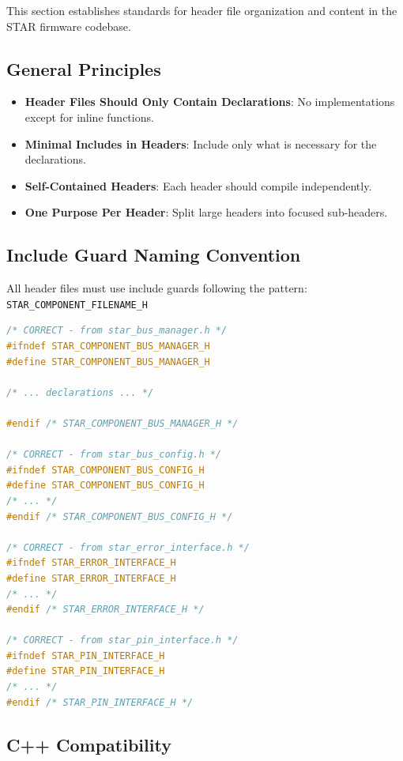 This section establishes standards for header file organization and content in the STAR firmware codebase.

\subsection{General Principles}

\begin{itemize}
    \item \textbf{Header Files Should Only Contain Declarations}: No implementations except for inline functions.
    \item \textbf{Minimal Includes in Headers}: Include only what is necessary for the declarations.
    \item \textbf{Self-Contained Headers}: Each header should compile independently.
    \item \textbf{One Purpose Per Header}: Split large headers into focused sub-headers.
\end{itemize}

\subsection{Include Guard Naming Convention}

All header files must use include guards following the pattern: \texttt{STAR\_COMPONENT\_FILENAME\_H}

\begin{lstlisting}[language=C]
/* CORRECT - from star_bus_manager.h */
#ifndef STAR_COMPONENT_BUS_MANAGER_H
#define STAR_COMPONENT_BUS_MANAGER_H

/* ... declarations ... */

#endif /* STAR_COMPONENT_BUS_MANAGER_H */

/* CORRECT - from star_bus_config.h */
#ifndef STAR_COMPONENT_BUS_CONFIG_H
#define STAR_COMPONENT_BUS_CONFIG_H
/* ... */
#endif /* STAR_COMPONENT_BUS_CONFIG_H */

/* CORRECT - from star_error_interface.h */
#ifndef STAR_ERROR_INTERFACE_H
#define STAR_ERROR_INTERFACE_H
/* ... */
#endif /* STAR_ERROR_INTERFACE_H */

/* CORRECT - from star_pin_interface.h */
#ifndef STAR_PIN_INTERFACE_H
#define STAR_PIN_INTERFACE_H
/* ... */
#endif /* STAR_PIN_INTERFACE_H */
\end{lstlisting}

\subsection{C++ Compatibility}

